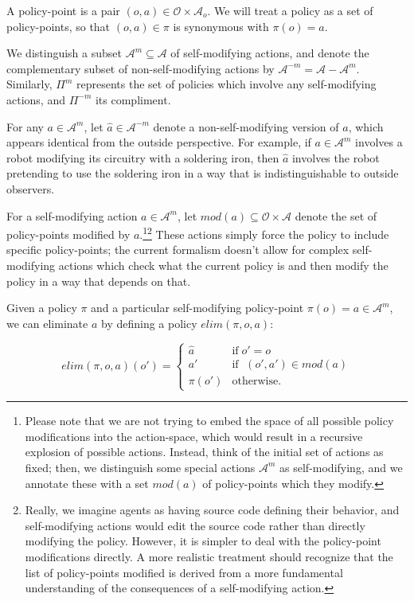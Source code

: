 \documentclass{article}
\begin{document}
A policy-point is a pair $(o,a) \in \mathcal{O} \times \mathcal{A}_o$. We will treat a policy as a set of policy-points, so that $(o,a) \in \pi$ is synonymous with $\pi (o) = a$.

We distinguish a subset $\mathcal{A}^m \subseteq \mathcal{A}$ of self-modifying actions, and denote the complementary subset of non-self-modifying actions by $\mathcal{A}^{-m} = \mathcal{A} - \mathcal{A}^m$. Similarly, $\Pi^m$ represents the set of policies which involve any self-modifying actions, and $\Pi^{-m}$ its compliment. 

For any $a \in \mathcal{A}^m$, let $\hat{a} \in \mathcal{A}^{-m}$ denote a non-self-modifying version of $a$, which appears identical from the outside perspective. For example, if $a \in \mathcal{A}^m$ involves a robot modifying its circuitry with a soldering iron, then $\hat a$ involves the robot pretending to use the soldering iron in a way that is indistinguishable to outside observers.

For a self-modifying action $a \in \mathcal{A}^m$, let $\textit{mod}(a) \subseteq \mathcal{O} \times \mathcal{A}$ denote the set of policy-points modified by $a$.\footnote{Please note that we are not trying to embed the space of all possible policy modifications into the action-space, which would result in a recursive explosion of possible actions. Instead, think of the initial set of actions as fixed; then, we distinguish some special actions $\mathcal{A}^m$ as self-modifying, and we annotate these with a set $\textit{mod}(a)$ of policy-points which they modify.}\footnote{Really, we imagine agents as having source code defining their behavior, and self-modifying actions would edit the source code rather than directly modifying the policy. However, it is simpler to deal with the policy-point modifications directly. A more realistic treatment should recognize that the list of policy-points modified is derived from a more fundamental understanding of the consequences of a self-modifying action.} These actions simply force the policy to include specific policy-points; the current formalism doesn't allow for complex self-modifying actions which check what the current policy is and then modify the policy in a way that depends on that.

Given a policy $\pi$ and a particular self-modifying policy-point $\pi(o)=a \in \mathcal{A}^m$, we can eliminate $a$ by defining a policy $\textit{elim}(\pi, o, a)$:

\begin{equation}
\textit{elim}(\pi, o, a)(o') = \begin{cases}
    \hat a & \text{if} \; o'=o \\
    a' & \text{if } \; (o', a') \in \textit{mod}(a) \\
    \pi(o') & \text{otherwise.}
\end{cases}
\end{equation}
\end{document}
